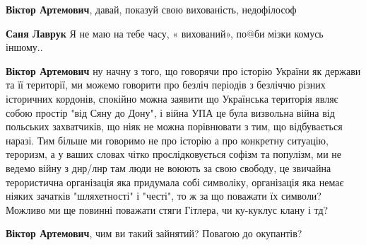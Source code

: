 \begin{itemize}
\begin{itemize}
\begin{itemize}
 
\textbf{Віктор Артемович}, давай, показуй свою вихованість, недофілософ🤣🤣🤣

 
\textbf{Саня Лаврук} Я не маю на тебе часу, « вихований», по@би мізки комусь іншому..

 
\textbf{Віктор Артемович} ну начну з того, що говорячи про історію України як
держави та її території, ми можемо говорити про безліч періодів з безліччю
різних історичних кордонів, спокійно можна заявити що Українська територія
являє собою простір "від Сяну до Дону", і війна УПА це була визвольна війна від
польських захватчиків, що ніяк не можна порівнювати з тим, що відбувається
наразі. Тим більше ми говоримо не про історію а про конкретну ситуацію,
тероризм, а у ваших словах чітко прослідковується софізм та популізм, ми не
ведемо війну з днр/лнр там люди не воюють за свою свободу, це звичайна
терористична організація яка придумала собі символіку, організація яка немає
ніяких зачатків "шляхетності" і "честі", то ж за що поважати їх символи?
Можливо ми ще повинні поважати стяги Гітлера, чи ку-куклус клану і тд?

 
\textbf{Віктор Артемович}, чим ви такий зайнятий? Повагою до окупантів?

 

\end{itemize}
\end{itemize}
\end{itemize}
